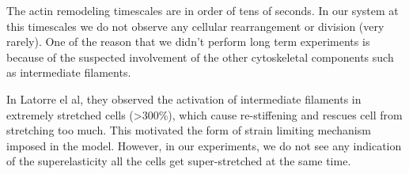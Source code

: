 The actin remodeling timescales are in order of tens of seconds. In our
system at this timescales we do not observe any cellular rearrangement
or division (very rarely). One of the reason that we didn't perform long
term experiments is because of the suspected involvement of the other
cytoskeletal components such as intermediate filaments.

In Latorre el al, they observed the activation of intermediate filaments
in extremely stretched cells (\textgreater300\%), which cause
re-stiffening and rescues cell from stretching too much. This motivated
the form of strain limiting mechanism imposed in the model. However, in
our experiments, we do not see any indication of the superelasticity all
the cells get super-stretched at the same time.
